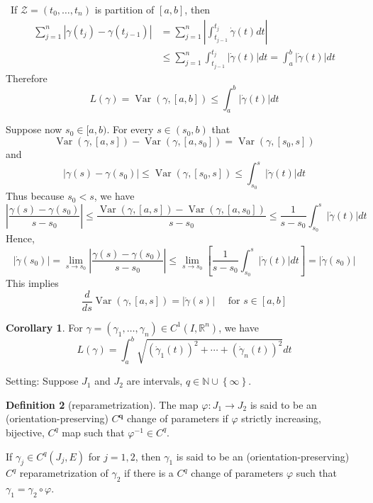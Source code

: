\documentclass[12pt,a4paper]{book}
\newenvironment{prooff}{{\noindent\it\textcolor{cyan!40!black}{Proof}:}\,}{\par}
\newcommand{\bbrace}[1]{\left\{ #1 \right\} }
\newcommand{\bb}[1]{\mathbb{#1}}
\theoremstyle{definition}
\newtheorem{defn}{Definition}[section]
\newtheorem{coro}[defn]{Corollary}
\begin{document}
\begin{prooff}
    If $\mathcal{Z}=\left(t_0, \ldots, t_n\right)$ is partition of $[a, b]$, then
    $$
    \begin{aligned}
    \sum_{j=1}^n\left|\gamma\left(t_j\right)-\gamma\left(t_{j-1}\right)\right| & =\sum_{j=1}^n\left|\int_{t_{j-1}}^{t_j} \dot{\gamma}(t) d t\right| \\
    & \leq \sum_{j=1}^n \int_{t_{j-1}}^{t_j}|\dot{\gamma}(t)| d t=\int_a^b|\dot{\gamma}(t)| d t
    \end{aligned}
    $$
    Therefore
    $$
    L(\gamma)=\operatorname{Var}(\gamma,[a, b]) \leq \int_a^b|\dot{\gamma}(t)| d t
    $$

    Suppose now $s_0 \in[a, b)$. For every $s \in\left(s_0, b\right)$ that
$$
\operatorname{Var}(\gamma,[a, s])-\operatorname{Var}\left(\gamma,\left[a, s_0\right]\right)=\operatorname{Var}\left(\gamma,\left[s_0, s\right]\right)
$$
and 
$$
\left|\gamma(s)-\gamma\left(s_0\right)\right| \leq \operatorname{Var}\left(\gamma,\left[s_0, s\right]\right) \leq \int_{s_0}^s|\dot{\gamma}(t)| d t
$$
Thus because $s_0<s$, we have
$$
\left|\frac{\gamma(s)-\gamma\left(s_0\right)}{s-s_0}\right| \leq \frac{\operatorname{Var}(\gamma,[a, s])-\operatorname{Var}\left(\gamma,\left[a, s_0\right]\right)}{s-s_0} \leq \frac{1}{s-s_0} \int_{s_0}^s|\dot{\gamma}(t)| d t
$$
Hence, 
$$
\left|\dot{\gamma}\left(s_0\right)\right|=\lim _{s \rightarrow s_0}\left|\frac{\gamma(s)-\gamma\left(s_0\right)}{s-s_0}\right| \leq \lim _{s \rightarrow s_0}\left[\frac{1}{s-s_0} \int_{s_0}^s|\dot{\gamma}(t)| d t\right]=\left|\dot{\gamma}\left(s_0\right)\right|
$$
This implies 
$$
\frac{d}{d s} \operatorname{Var}(\gamma,[a, s])=|\dot{\gamma}(s)| \quad \text { for } s \in[a, b]
$$
\end{prooff}
\begin{coro}
    For $\gamma=\left(\gamma_1, \ldots, \gamma_n\right) \in C^1\left(I, \mathbb{R}^n\right)$, we have
    $$
    L(\gamma)=\int_a^b \sqrt{\left(\dot{\gamma}_1(t)\right)^2+\cdots+\left(\dot{\gamma}_n(t)\right)^2} d t
    $$    
\end{coro}
Setting: Suppose $J_1$ and $J_2$ are intervals, $q\in \bb{N}\cup\bbrace{\infty}$. 
\begin{defn}[reparametrization]
    The map $\varphi: J_1 \rightarrow J_2$ is said to be an (orientation-preserving) 
    $C^{\boldsymbol{q}}$ change of parameters if 
    $\varphi$ strictly increasing, bijective, $C^q$ map such that $\varphi^{-1}\in C^q$. 
    
    If $\gamma_j \in C^q\left(J_j, E\right)$ for $j=1,2$, then $\gamma_1$ is said to be an (orientation-preserving) $C^q$ 
    reparametrization of $\gamma_2$ if there is a $C^q$ change of parameters $\varphi$ such that $\gamma_1=\gamma_2 \circ \varphi$.
\end{defn}
\end{document}
